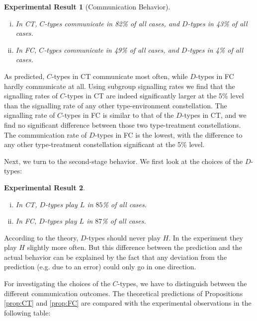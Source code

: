 \documentclass[12pt]{article}
\theoremstyle{break}
\newtheorem{result}{Experimental Result}\theoremstyle{break}
\begin{document}
\begin{result}[Communication Behavior]
	\begin{enumerate}[i)]\setlength\itemsep{0em}
		\item In CT, $C$-types communicate in 82\% of all cases, and $D$-types in 43\% of all cases.
		\item In FC, $C$-types communicate in 49\% of all cases, and $D$-types in 4\% of all cases.
	\end{enumerate}
\end{result}


As predicted, $C$-types in CT communicate most often, while $D$-types in FC hardly communicate at all. Using subgroup signalling rates we find that the signalling rates of $C$-types in CT are indeed significantly larger at the 5\% level than the signalling rate of any other type-environment constellation. The signalling rate of $C$-types in FC is similar to that of the $D$-types in CT, and we find no significant difference between those two type-treatment constellations. The communication rate of $D$-types in FC is the lowest, with the difference to any other type-treatment constellation significant at the 5\% level.

Next, we turn to the second-stage behavior. We first look at the choices of the $D$-types:

\begin{result}
	\begin{enumerate}[i)]\setlength\itemsep{0em}
		\item In CT, $D$-types play $L$ in $85$\% of all cases.
		\item In FC, $D$-types play $L$ in $87$\% of all cases.
	\end{enumerate}
\end{result}

According to the theory, $D$-types should never play $H$. In the experiment they play $H$ slightly more often. But this difference between the prediction and the actual behavior can be explained by the fact that any deviation from the prediction (e.g. due to an error) could only go in one direction.

For investigating the choices of the $C$-types, we have to distinguish between the different communication outcomes. The theoretical predictions of Propositions \ref{prop:CT} and \ref{prop:FC} are compared with the experimental observations in the following table:
\end{document}

